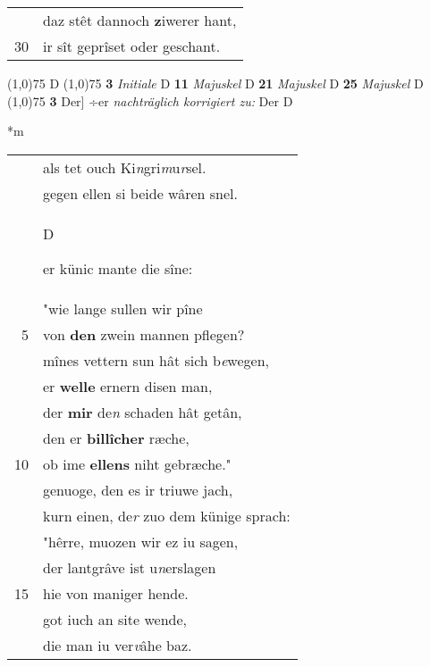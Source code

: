 \documentclass[8pt,a4paper,notitlepage]{article}
\begin{document}
\begin{table}[ht]
\begin{minipage}[t]{0.5\linewidth}
\begin{tabular}{rl}
 & daz stêt dannoch \textbf{z}iwerer hant,\\ 
30 & ir sît geprîset oder geschant.\\ 
\end{tabular}
\scriptsize
\line(1,0){75} \newline
D \newline
\line(1,0){75} \newline
\textbf{3} \textit{Initiale} D  \textbf{11} \textit{Majuskel} D  \textbf{21} \textit{Majuskel} D  \textbf{25} \textit{Majuskel} D  \newline
\line(1,0){75} \newline
\textbf{3} Der] ÷er \textit{nachträglich korrigiert zu:} Der D \newline
\end{minipage}
\hspace{0.5cm}
\begin{minipage}[t]{0.5\linewidth}
\small
\begin{center}*m
\end{center}
\begin{tabular}{rl}
 & als tet ouch Ki\textit{n}gri\textit{m}u\textit{r}sel.\\ 
 & gegen ellen si beide wâren snel.\\ 
 & \begin{large}D\end{large}er künic mante die sîne:\\ 
 & "wie lange sullen wir pîne\\ 
5 & von \textbf{den} zwein mannen pflegen?\\ 
 & mînes vettern sun hât sich b\textit{e}wegen,\\ 
 & er \textbf{welle} ernern disen man,\\ 
 & der \textbf{mir} de\textit{n} schaden hât getân,\\ 
 & den er \textbf{billîcher} ræche,\\ 
10 & ob ime \textbf{ellens} niht gebræche."\\ 
 & genuoge, den es ir triuwe jach,\\ 
 & kurn einen, de\textit{r} zuo dem künige sprach:\\ 
 & "hêrre, muozen wir ez iu sagen,\\ 
 & der lantgrâve ist u\textit{n}erslagen\\ 
15 & hie von maniger hende.\\ 
 & got iuch an site wende,\\ 
 & die man iu ver\textit{v}âhe baz.\\ 

\end{tabular}
\end{minipage}
\end{table}
\end{document}
